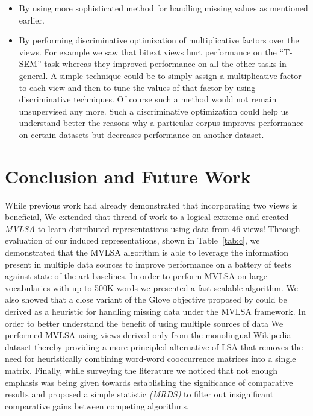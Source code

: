 \documentclass[11pt]{article}
\begin{document}
{\begin{itemize}[leftmargin=*]
  have been caused due to lack of PMI type features have been reported
  to work well in \cite{levy2014neural}.  
\item By using more sophisticated method for handling missing values
  as mentioned earlier.
\item By performing discriminative optimization of multiplicative
  factors over the views. For example we saw that bitext views hurt
  performance on the ``T-SEM'' task whereas they improved performance
  on all the other tasks in general. A simple technique could be to
  simply assign a multiplicative factor to each view and 
  then to tune the values of that factor by using discriminative
  techniques. Of course such a method would not remain unsupervised any
  more. Such a discriminative optimization could help us understand
  better the reasons why a particular corpus improves performance on
  certain datasets but decreases performance on another dataset. %
\end{itemize}
}

\section{Conclusion and Future Work}
While previous work had already demonstrated that incorporating two views
is beneficial, We extended that thread of work to a
logical extreme and created \emph{MVLSA} to learn distributed 
representations using data from 46 views! Through evaluation of our
induced representations, shown in Table~\ref{tab:c}, we demonstrated that
the MVLSA algorithm is able to leverage the information present in  
multiple data sources to improve performance on a battery of tests
against state of the art baselines. In order to
 perform MVLSA on large vocabularies with up to 500K words
we presented a fast scalable algorithm. We also showed that a close
variant of the Glove objective proposed by 
 could be derived as a heuristic for
handling missing data under the MVLSA framework. In order to better
understand the benefit of using multiple sources of data We 
performed  MVLSA using views derived only from the monolingual Wikipedia
dataset thereby providing a more principled alternative of LSA that
removes the need for heuristically combining word-word cooccurrence 
matrices into a single matrix. Finally, while surveying the literature
we noticed that not enough emphasis was being given towards
establishing the significance of 
comparative results and proposed a simple statistic \emph{(MRDS)}
to filter out insignificant comparative gains between competing
algorithms.
\end{document}
